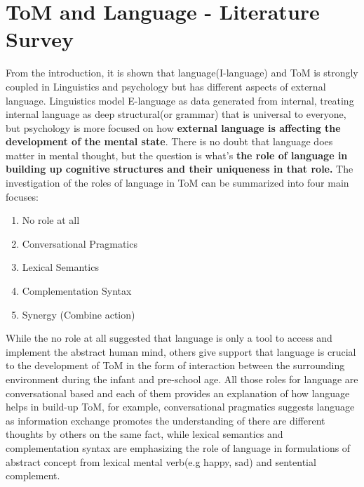 \documentclass[12pt]{article}
\begin{document}
\section{ToM and Language - Literature Survey} 
From the introduction, it is shown that language(I-language) and ToM is strongly coupled in Linguistics and psychology but has different aspects of external language. Linguistics model E-language as data generated from internal, treating internal language as deep structural(or grammar) that is universal to everyone, but psychology is more focused on how \textbf{external language is affecting the development of the mental state}. There is no doubt that language does matter in mental thought, but the question is what's \textbf{the role of language in building up cognitive structures and their uniqueness in that role\cite{Astington_2005}.} The investigation of the roles of language in ToM can be summarized into four main focuses\cite{Astington_2005}:
\begin{enumerate}
    \item No role at all
    \item Conversational Pragmatics
    \item Lexical Semantics
    \item Complementation Syntax
    \item Synergy (Combine action)
\end{enumerate}
While the no role at all suggested that language is only a tool to access and implement the abstract human mind, others give support that language is crucial to the development of ToM in the form of interaction between the surrounding environment during the infant and pre-school age. All those roles for language are conversational based and each of them provides an explanation of how language helps in build-up ToM, for example, conversational pragmatics suggests language as information exchange promotes the understanding of there are different thoughts by others on the same fact, while lexical semantics and complementation syntax are emphasizing the role of language in formulations of abstract concept from lexical mental verb(e.g happy, sad) and sentential complement.
\end{document}
